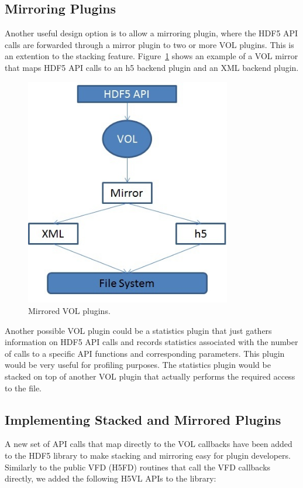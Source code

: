 \subsection{Mirroring Plugins}
Another useful design option is to allow a mirroring plugin, where the
HDF5 API calls are forwarded through a mirror plugin to two or more
VOL plugins. This is an extention to the stacking
feature. Figure~\ref{mirror} shows an example of a VOL mirror that
maps HDF5 API calls to an h5 backend plugin and an XML backend plugin.

\begin{figure}[ht!]
\centering
\includegraphics[width=90mm]{mirrored.jpg}
\caption{Mirrored VOL plugins.}
\label{mirror}
\end{figure}

Another possible VOL plugin could be a statistics plugin that just
gathers information on HDF5 API calls and records statistics
associated with the number of calls to a specific API functions and
corresponding parameters. This plugin would be very useful for
profiling purposes. The statistics plugin would be stacked on top of
another VOL plugin that actually performs the required access to the
file.

\subsection{Implementing Stacked and Mirrored Plugins}
A new set of API calls that map directly to the VOL callbacks have
been added to the HDF5 library to make stacking and mirroring easy for
plugin developers. Similarly to the public VFD (H5FD) routines that
call the VFD callbacks directly, we added the following H5VL APIs to
the library:

